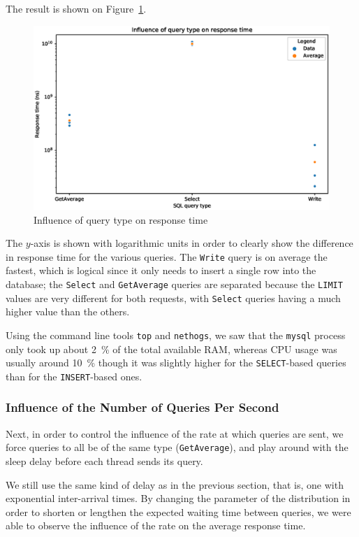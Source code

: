 \documentclass[journal]{IEEEtran}
\theoremstyle{definition}
\newcommand{\java}[1]{\texttt{#1}}
\newcommand{\sql}[1]{\texttt{#1}}
\begin{document}
The result is shown on Figure~\ref{fig:query_influence}.
\begin{figure}[!hbtp]
	\centering
	\includegraphics[width=\columnwidth]{../plotting/query_influence}
	\caption{Influence of query type on response time}
	\label{fig:query_influence}
\end{figure}
The \(y\)-axis is shown with logarithmic units in order to clearly show the difference in response time for the various queries.
The \java{Write} query is on average the fastest, which is logical since it only needs to insert a single row into the database; the \java{Select} and \java{GetAverage} queries are separated because the \sql{LIMIT} values are very different for both requests, with \java{Select} queries having a much higher value than the others.

Using the command line tools \texttt{top} and \texttt{nethogs}, we saw that the \texttt{mysql} process only took up about \SI{2}{\percent} of the total available RAM, whereas CPU usage was usually around \SI{10}{\percent} though it was slightly higher for the \sql{SELECT}-based queries than for the \sql{INSERT}-based ones.

\subsubsection{Influence of the Number of Queries Per Second}
Next, in order to control the influence of the rate at which queries are sent, we force queries to all be of the same type (\java{GetAverage}), and play around with the sleep delay before each thread sends its query.

We still use the same kind of delay as in the previous section, that is, one with exponential inter-arrival times.
By changing the parameter of the distribution in order to shorten or lengthen the expected waiting time between queries, we were able to observe the influence of the rate on the average response time.
\end{document}
